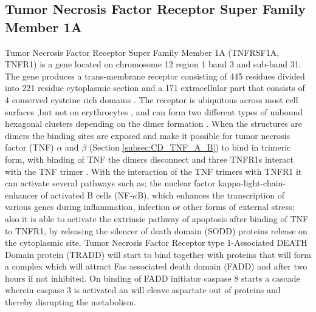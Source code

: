 \subsection{Tumor Necrosis Factor Receptor Super Family Member 1A}
Tumor Necrosis Factor Receptor Super Family Member 1A (TNFRSF1A, TNFR1) is a gene located on chromosome 12 region 1 band 3 and sub-band 31. The gene produces a trans-membrane receptor consisting of 445 residues divided into 221 residue cytoplasmic section and a 171 extracellular part that consists of 4 conserved cysteine rich domains \cite{}.
The receptor is ubiquitous across most cell surfaces ,but not on erythrocytes \cite{}, and can form two different types of unbound hexagonal clusters depending on the dimer formation \cite{}. 
When the structures are dimers the binding sites are exposed and make it possible for tumor necrosis factor (TNF) $\alpha$ and $\beta$  (Section \ref{subsec:CD_TNF_A_B}) to bind in trimeric form, with binding of TNF the dimers disconnect and three TNFR1s interact with the TNF trimer \cite{}.
With the interaction of the TNF trimers with TNFR1 it can activate several pathways such as; the nuclear factor kappa-light-chain-enhancer of activated B cells (NF-$\kappa$B), which enhances the transcription of various genes during inflammation, infection or other forms of external stress; also it is able to activate the extrinsic pathway of apoptosis after binding of TNF to TNFR1, by releasing the silencer of death domain (SODD) proteins release on the cytoplasmic site. Tumor Necrosis Factor Receptor type 1-Associated DEATH Domain protein (TRADD) \cite{}
 will start to bind together with proteins that will form a complex which will attract Fas associated death domain (FADD) and after two hours\cite{} if not inhibited. 
On binding of FADD initiator caspase 8  starts a cascade wherein caspase 3 is activated an will cleave aspartate out of proteins and thereby disrupting the metabolism\cite{}.
\label{subsec:CD_TNFRSF1A}

